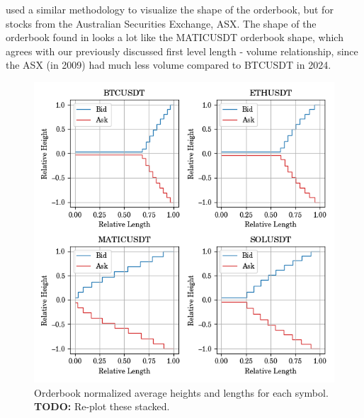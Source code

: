 \documentclass[a4paper, oneside, notitlepage]{book}
\begin{document}
\cite{CAO2009} used a similar methodology to visualize the shape of the orderbook,
but for stocks from the Australian Securities Exchange, ASX. The shape of the orderbook
found in \cite{CAO2009} looks a lot like the MATICUSDT orderbook shape, which
agrees with our previously discussed first level length - volume relationship, since the ASX
(in 2009) had much less volume compared to BTCUSDT in 2024.

\begin{figure}[htpb]
    \centering
    \includegraphics[width=1.0\textwidth]{./images/shapes.png}
    \caption{Orderbook normalized average heights and lengths for each symbol. \textbf{TODO:} Re-plot these stacked.}
    \label{shape}
\end{figure}
\end{document}
